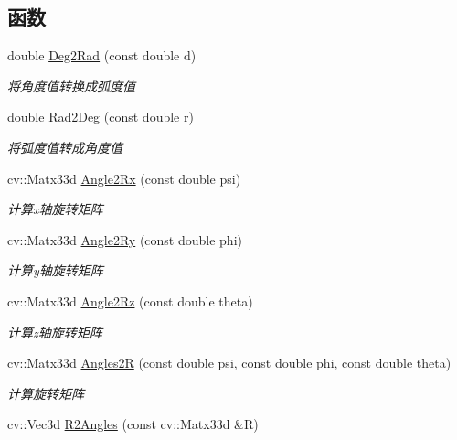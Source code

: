 \subsection*{函数}
\begin{DoxyCompactItemize}
\item 
double \mbox{\hyperlink{namespacemy__linear__algebra_aa9ecf9b22bbf44d286bf404af3461d58}{Deg2\+Rad}} (const double d)
\begin{DoxyCompactList}\small\item\em 将角度值转换成弧度值 \end{DoxyCompactList}\item 
double \mbox{\hyperlink{namespacemy__linear__algebra_a899a8fdd5b4b176a7eab324b7b8fd812}{Rad2\+Deg}} (const double r)
\begin{DoxyCompactList}\small\item\em 将弧度值转成角度值 \end{DoxyCompactList}\item 
cv\+::\+Matx33d \mbox{\hyperlink{namespacemy__linear__algebra_af25af21d6df34ed01c3b167b301f14de}{Angle2\+Rx}} (const double psi)
\begin{DoxyCompactList}\small\item\em 计算x轴旋转矩阵 \end{DoxyCompactList}\item 
cv\+::\+Matx33d \mbox{\hyperlink{namespacemy__linear__algebra_aa49a94528c255627f05e020b5be3f1e3}{Angle2\+Ry}} (const double phi)
\begin{DoxyCompactList}\small\item\em 计算y轴旋转矩阵 \end{DoxyCompactList}\item 
cv\+::\+Matx33d \mbox{\hyperlink{namespacemy__linear__algebra_a5b7ede204e82cae38ed044eea54e4d79}{Angle2\+Rz}} (const double theta)
\begin{DoxyCompactList}\small\item\em 计算z轴旋转矩阵 \end{DoxyCompactList}\item 
cv\+::\+Matx33d \mbox{\hyperlink{namespacemy__linear__algebra_adf49893ee693256be7a97133ceaa551d}{Angles2R}} (const double psi, const double phi, const double theta)
\begin{DoxyCompactList}\small\item\em 计算旋转矩阵 \end{DoxyCompactList}\item 
cv\+::\+Vec3d \mbox{\hyperlink{namespacemy__linear__algebra_a362b45c147136aa0f1045200545cb38a}{R2\+Angles}} (const cv\+::\+Matx33d \&R)

\end{DoxyCompactItemize}
